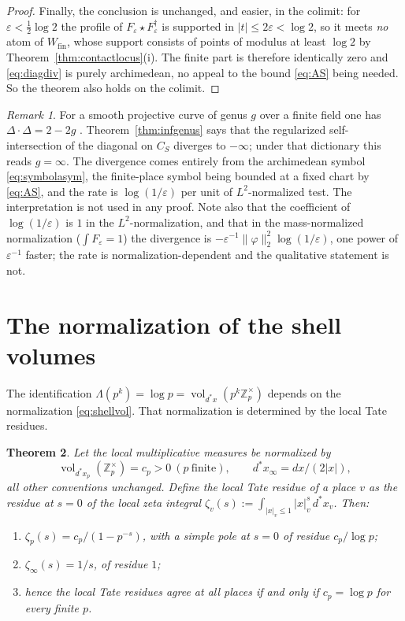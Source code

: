 \documentclass[11pt]{amsart}
\newtheorem{theorem}{Theorem}[section]
\theoremstyle{definition}
\theoremstyle{remark}
\newtheorem{remark}[theorem]{Remark}
\newcommand{\Z}{\mathbb Z}
\newcommand{\vol}{\operatorname{vol}}
\newcommand{\Wfin}{W_{\mathrm{fin}}}
\begin{document}
\begin{proof}
Finally, the conclusion is unchanged, and easier, in the colimit: for
$\varepsilon<\tfrac12\log2$ the profile of
$F_\varepsilon\star F_\varepsilon^\dagger$ is supported in
$|t|\le2\varepsilon<\log2$, so it meets \emph{no} atom of $\Wfin$, whose
support consists of points of modulus at least $\log2$ by
Theorem~\ref{thm:contactlocus}(i). The finite part is therefore identically
zero and \eqref{eq:diagdiv} is purely archimedean, no appeal to the bound
\eqref{eq:AS} being needed.  So the theorem also holds on the colimit.
\end{proof}

\begin{remark}\label{rem:infinitegenus}
For a smooth projective curve of genus $g$ over a finite field one has
$\Delta\cdot\Delta=2-2g$ \cite{Weil1948}. Theorem~\ref{thm:infgenus} says that
the regularized self-intersection of the diagonal on $C_S$ diverges to
$-\infty$; under that dictionary this reads $g=\infty$. The
divergence comes entirely from the archimedean symbol
\eqref{eq:symbolasym}, the finite-place symbol being bounded at a fixed chart
by \eqref{eq:AS}, and the rate is $\log(1/\varepsilon)$ per unit of
$L^2$-normalized test.  The interpretation is not used in any proof.  Note also
that the coefficient of $\log(1/\varepsilon)$ is $1$ in the
$L^2$-normalization, and that in the mass-normalized normalization
($\int F_\varepsilon=1$) the divergence is
$-\varepsilon^{-1}\|\varphi\|_2^2\log(1/\varepsilon)$, one power of
$\varepsilon^{-1}$ faster; the rate is normalization-dependent and the
qualitative statement is not.
\end{remark}

\section{The normalization of the shell volumes}
\label{sec:normalization}

The identification $\Lambda(p^k)=\log p=\vol_{d^*x}(p^k\Z_p^\times)$ depends on
the normalization \eqref{eq:shellvol}.  That normalization is determined by
the local Tate residues.

\begin{theorem}\label{thm:tateresidue}
Let the local multiplicative measures be normalized by
\[
  \vol_{d^*x_p}(\Z_p^\times)=c_p>0\ (p\ \text{finite}),\qquad
  d^*x_\infty=dx/(2|x|),
\]
all other conventions unchanged. Define the \emph{local Tate residue} of a
place $v$ as the residue at $s=0$ of the local zeta integral
$\zeta_v(s):=\int_{|x|_v\le1}|x|_v^s\,d^*x_v$. Then:
\begin{enumerate}
\item[(i)] $\zeta_p(s)=c_p/(1-p^{-s})$, with a simple pole at $s=0$ of residue
$c_p/\log p$;
\item[(ii)] $\zeta_\infty(s)=1/s$, of residue $1$;
\item[(iii)] hence the local Tate residues agree at all places if and only if
$c_p=\log p$ for every finite $p$.
\end{enumerate}
\end{theorem}
\end{document}
